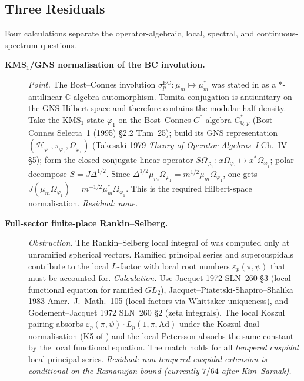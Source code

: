 \subsection{Three Residuals}
\label{v4-arith:kms-gns:table}

Four calculations separate the operator-algebraic, local, spectral,
and continuous-spectrum questions.

\begin{description}
\item[\textbf{KMS\({}_{1}\)/GNS normalisation of the BC involution.}] \emph{Point.} The Bost--Connes involution
\(\sigma^{\mathrm{BC}}_{p}\colon\mu_{m}\mapsto\mu_{m}^{*}\) was
stated in  as a
\(*\)-antilinear \(\mathbb{C}\)-algebra automorphism.  Tomita
conjugation is antiunitary on the GNS Hilbert space and therefore
contains the modular half-density. Take the KMS\({}_{1}\) state
\(\varphi_{1}\) on the Bost--Connes \(C^{*}\)-algebra
\(C^{*}_{\mathbb{Q},p}\) (Bost--Connes Selecta~1 (1995) \S2.2 Thm~25);
build its GNS representation \((\mathcal{H}_{\varphi_{1}},\pi_{\varphi_{1}},\Omega_{\varphi_{1}})\)
(Takesaki 1979 \emph{Theory of Operator Algebras~I} Ch.~IV \S5);
form the closed conjugate-linear operator
\(S\Omega_{\varphi_{1}}:\,x\Omega_{\varphi_{1}}\mapsto x^{*}\Omega_{\varphi_{1}}\);
polar-decompose \(S=J\Delta^{1/2}\). Since
\(\Delta^{1/2}\mu_m\Omega_{\varphi_1}=m^{1/2}\mu_m\Omega_{\varphi_1}\),
one gets \(J(\mu_m\Omega_{\varphi_1})=m^{-1/2}\mu_m^{*}\Omega_{\varphi_1}\).
This is the required Hilbert-space normalisation.
\emph{Residual: none.}

\item[\textbf{Full-sector finite-place Rankin--Selberg.}] \emph{Obstruction.}
The Rankin--Selberg local integral of
 was computed only at unramified
spherical vectors. Ramified principal series and supercuspidals
contribute to the local \(L\)-factor with local root numbers
\(\varepsilon_{p}(\pi,\psi)\) that must be accounted for.
\emph{Calculation.} Use Jacquet 1972 SLN~260 \S3 (local functional equation
for ramified \(GL_{2}\)), Jacquet--Piatetski-Shapiro--Shalika 1983
Amer.~J.~Math.~105 (local factors via Whittaker uniqueness), and
Godement--Jacquet 1972 SLN~260 \S2 (zeta integrals). The local
Koszul pairing absorbs \(\varepsilon_{p}(\pi,\psi)\cdot L_{p}(1,\pi,\mathrm{Ad})\)
under the Koszul-dual normalisation (K5 of
) and the
local Petersson absorbs the same constant by the local
functional equation. The match holds for all \emph{tempered cuspidal}
local principal series.
\emph{Residual: non-tempered cuspidal extension is conditional on
the Ramanujan bound (currently \(7/64\) after Kim--Sarnak).}


\end{description}
